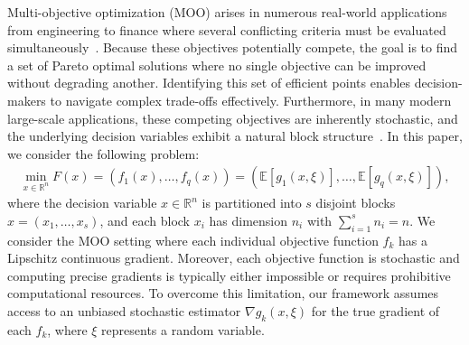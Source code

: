 \documentclass[11pt,a4paper]{article}
\numberwithin{equation}{section}%
\renewcommand{\(}{\left (}
\renewcommand{\)}{\right )}
\begin{document}
Multi-objective optimization (MOO) arises in numerous real-world applications from engineering to finance where several conflicting criteria must be evaluated simultaneously~\cite{KMiettinen_2012,MEhrgott_2005,marler2004survey,NGunantara_2018}. Because these objectives potentially compete, the goal is to find a set of Pareto optimal solutions where no single objective can be improved without degrading another. Identifying this set of efficient points enables decision-makers to navigate complex trade-offs effectively. Furthermore, in many modern large-scale applications, these competing objectives are inherently stochastic, and the underlying decision variables exhibit a natural block structure~\cite{wright2015coordinate,shi2016primer,Nesterov2012EfficiencyOC}.
In this paper, we consider the following problem: 
\begin{align*}
    \min_{x\in \mathbb{R}^n} F(x) = (f_1(x), \dots, f_q(x))  = (\mathbb{E}[g_1(x,\xi)], \ldots, \mathbb{E}[g_q(x, \xi)]),
\end{align*}
where %
the decision variable $x \in \mathbb{R}^n$ is partitioned into $s$ disjoint blocks $x = (x_1, \dots, x_s)$, and each block $x_i$ has dimension $n_i$ with $\sum_{i=1}^s n_i = n$. 
We consider the MOO setting where each individual objective function $f_k$ has a Lipschitz continuous
gradient.
Moreover, each objective function is stochastic and computing precise gradients is typically either impossible or requires prohibitive computational resources. To overcome this limitation, our framework assumes access to an unbiased stochastic estimator $\nabla g_k(x, \xi)$ for the true gradient of each $f_k$, where $\xi$ represents a random variable.

\end{document}
